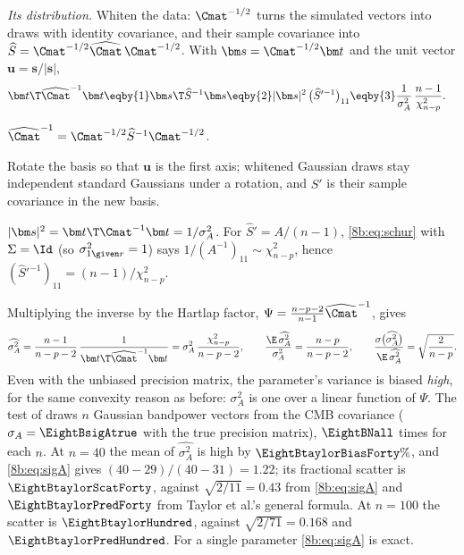 \emph{Its distribution.} Whiten the data: $\Cmat^{-1/2}$ turns the simulated vectors into draws with identity
covariance, and their sample covariance into $\widehat S=\Cmat^{-1/2}\widehat\Cmat\,\Cmat^{-1/2}$. With $\bm s=\Cmat^{-1/2}\bm t$ and the
unit vector $\bm u=\bm s/|\bm s|$,
\begin{align*}
  \bm t\T\widehat\Cmat^{-1}\bm t
  &\eqby{1}\bm s\T\widehat S^{-1}\bm s
   \eqby{2}|\bm s|^2\,\bigl(\widehat S'^{-1}\bigr)_{11}
   \eqby{3}\frac1{\sigma_A^2}\,\frac{n-1}{\chi^2_{n-p}} .
\end{align*}
\begin{explain}
  \item $\widehat\Cmat^{-1}=\Cmat^{-1/2}\widehat S^{-1}\Cmat^{-1/2}$.
  \item Rotate the basis so that $\bm u$ is the first axis; whitened Gaussian draws stay independent standard
        Gaussians under a rotation, and $\widehat S'$ is their sample covariance in the new basis.
  \item $|\bm s|^2=\bm t\T\Cmat^{-1}\bm t=1/\sigma_A^2$. For $\widehat S'=A/(n-1)$, \eqref{8b:eq:schur} with $\Sigma=\Id$ (so
        $\sigma^2_{1\given r}=1$) says $1/(A^{-1})_{11}\sim\chi^2_{n-p}$, hence $(\widehat S'^{-1})_{11}=(n-1)/\chi^2_{n-p}$.
\end{explain}
Multiplying the inverse by the Hartlap factor, $\Psi=\frac{n-p-2}{n-1}\widehat\Cmat^{-1}$, gives
\begin{equation}
  \widehat{\sigma^2_A}=\frac{n-1}{n-p-2}\,\frac1{\bm t\T\widehat\Cmat^{-1}\bm t}
  =\sigma_A^2\,\frac{\chi^2_{n-p}}{n-p-2},
  \qquad
  \frac{\E\,\widehat{\sigma^2_A}}{\sigma^2_A}=\frac{n-p}{n-p-2},\qquad
  \frac{\sigma\bigl(\widehat{\sigma^2_A}\bigr)}{\E\,\widehat{\sigma^2_A}}=\sqrt{\frac2{n-p}} .
  \label{8b:eq:sigA}
\end{equation}
Even with the unbiased precision matrix, the parameter's variance is biased \emph{high}, for the same
convexity reason as before: $\sigma_A^2$ is one over a linear function of $\Psi$. The test of
 draws $n$ Gaussian bandpower vectors from the CMB covariance ($\sigma_A=\EightBsigAtrue$ with the
true precision matrix), $\EightBNall$ times for each $n$. At $n=40$ the mean of $\widehat{\sigma^2_A}$ is high by
$\EightBtaylorBiasForty\%$, and \eqref{8b:eq:sigA} gives $(40-29)/(40-31)=1.22$; its fractional scatter is $\EightBtaylorScatForty$,
against $\sqrt{2/11}=0.43$ from \eqref{8b:eq:sigA} and $\EightBtaylorPredForty$ from Taylor et al.'s general formula. At
$n=100$ the scatter is $\EightBtaylorHundred$, against $\sqrt{2/71}=0.168$ and $\EightBtaylorPredHundred$. For a single parameter
\eqref{8b:eq:sigA} is exact.

